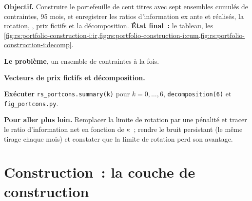 \begin{tutorial}
\textbf{Objectif.} Construire le portefeuille de cent titres avec sept ensembles cumulés de contraintes, 95 mois, et enregistrer les ratios d'information ex ante et réalisés, la rotation,
, prix fictifs et la décomposition. \textbf{État final~:} le tableau, les \cref{fig:rs:portfolio-construction-i:ir,fig:rs:portfolio-construction-i:cum,fig:rs:portfolio-construction-i:decomp}.
\begin{tutsteps}
\item \textbf{Le problème}, un ensemble de contraintes à la fois.
\label{lst:rs:portfolio-construction-i:build}
\item \textbf{Vecteurs de prix fictifs et décomposition.}
\label{lst:rs:portfolio-construction-i:decomp}
\item \textbf{Exécuter} \texttt{rs\_portcons.summary(k)} pour $k = 0, \dots, 6$, \texttt{decomposition(6)} et \texttt{fig\_portcons.py}.
\end{tutsteps}
\textbf{Pour aller plus loin.} Remplacer la limite de rotation par une pénalité et tracer le ratio d'information net en fonction de $\kappa$~; rendre le bruit persistant (le même
tirage chaque mois) et constater que la limite de rotation perd son avantage.
\end{tutorial}

\section{Construction~: la couche de construction}\label{bld:rs:portfolio-construction-i:portcons}

